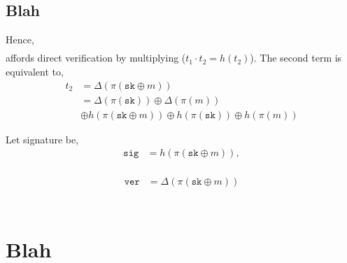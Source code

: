 \documentclass[twocolumn, aps, amsmath, amssymb, nofootinbib, superscriptaddress, longbibliography, doublefloatfix, table-of-contents, eqsecnum, rmp]{revtex4-2}
\begin{document}




\subsection{Blah}

Hence,
\begin{align}
	[h(\pi(\mathtt{sk} \oplus m)), \Delta(\pi(\mathtt{sk} \oplus m))]
\end{align}
affords direct verification by multiplying ($t_1\cdot t_2 = h(t_2)$). The second term is equivalent to,
\begin{align}
	t_2 &= \Delta(\pi(\mathtt{sk} \oplus m)) \nonumber\\
	&= \Delta(\pi(\mathtt{sk})) \oplus \Delta(\pi(m)) \nonumber\\
	&\oplus h(\pi(\mathtt{sk} \oplus m))
 \oplus h(\pi(\mathtt{sk})) \oplus h(\pi(m))
\end{align}


Let signature be,
\begin{align}
	\mathtt{sig} &= h(\pi(\mathtt{sk} \oplus m)),\nonumber\\
\end{align}

\begin{align}
	\mathtt{ver} &= \Delta(\pi(\mathtt{sk} \oplus m)) \nonumber\\
\end{align}

\begin{align}
	[\mathtt{sig}, \mathtt{ver}]
\end{align}


\section{Blah}
\end{document}
